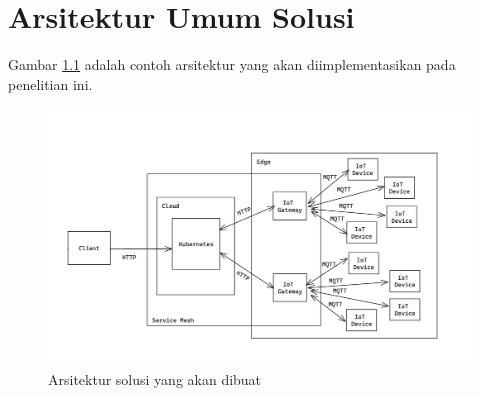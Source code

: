 \chapter{Arsitektur Umum Solusi}
\label{appendix:gambaran-umum-solusi}
Gambar \ref{fig:appendix-gambaran-umum-solusi} adalah contoh arsitektur yang akan diimplementasikan pada penelitian ini.

\begin{figure}[h]
  \centering
  \includegraphics[width=1\textwidth]{resources/appendix/gambaran-umum-solusi.jpg}
  \caption{Arsitektur solusi yang akan dibuat}
  \label{fig:appendix-gambaran-umum-solusi}
\end{figure}